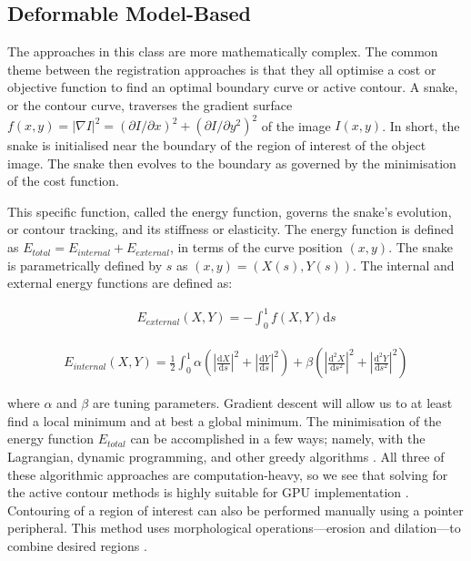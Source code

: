 \documentclass{bmcart}
\begin{document}
\subsection*{Deformable Model-Based}
The approaches in this class are more mathematically complex. The common theme between the registration approaches is that they all optimise a cost or objective function to find an optimal boundary curve or active contour. A snake, or the contour curve, traverses the gradient surface $f(x,y)=|\nabla I|^2=({\partial I}/{\partial x})^2+({\partial I}/{\partial y^2})^2$ of the image $I(x,y)$. In short, the snake is initialised near the boundary of the region of interest of the object image. The snake then evolves to the boundary as governed by the minimisation of the cost function. 
\par This specific function, called the energy function, governs the snake's evolution, or contour tracking, and its stiffness or elasticity. The energy function is defined as $E_{total}=E_{internal}+E_{external}$, in terms of the curve position $(x,y)$. The snake is parametrically defined by $s$ as $(x,y)=(X(s),Y(s))$. The internal and external energy functions are defined as:
\begin{ceqn}
\begin{align}
    E_{external}(X,Y) = - \int_0^1 f(X,Y)\mathrm{d}s
\end{align}
\end{ceqn}
\begin{ceqn}
\begin{align}
    E_{internal}(X,Y)=\frac{1}{2} \int_0^1 \alpha (|\frac{\mathrm{d}X}{\mathrm{d}s}|^2 + |\frac{\mathrm{d}Y}{\mathrm{d}s}|^2) + \beta (|\frac{\mathrm{d}^2X}{\mathrm{d}s^2}|^2 + |\frac{\mathrm{d}^2Y}{\mathrm{d}s^2}|^2)
\end{align}
\end{ceqn}
where $\alpha$ and $\beta$ are tuning parameters. Gradient descent will allow us to at least find a local minimum and at best a global minimum. The minimisation of the energy function $E_{total}$ can be accomplished in a few ways; namely, with the Lagrangian, dynamic programming, and other greedy algorithms \cite{el-baz_biomedical_2017}. All three of these algorithmic approaches are computation-heavy, so we see that solving for the active contour methods is highly suitable for GPU implementation \cite{smistad_medical_2015}. Contouring of a region of interest can also be performed manually using a pointer peripheral. This method uses morphological operations---erosion and dilation---to combine desired regions \cite{brock_image_2014}.
\end{document}
